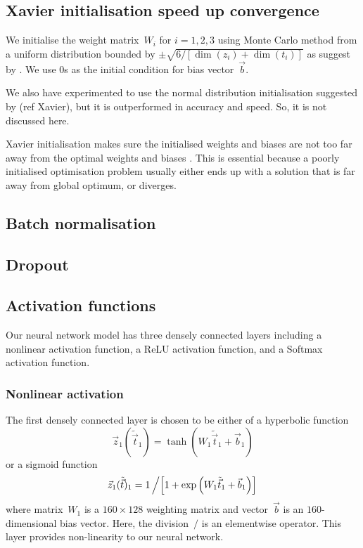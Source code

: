 \subsection{Xavier initialisation speed up convergence}
We initialise the weight matrix~$W_i$ for $i=1,2,3$ using Monte Carlo method from a uniform distribution bounded by $\pm \sqrt{6/\left[\dim(z_i)+\dim(t_i)\right]}$ as suggest by \citet{pmlr-v9-glorot10a}. We use $0$s as the initial condition for bias vector~$\vec b$.

We also have experimented to use the normal distribution initialisation suggested by (ref Xavier), but it is outperformed in accuracy and speed. So, it is not discussed here.

Xavier initialisation makes sure the initialised weights and biases are not too far away from the optimal weights and biases \citep{pmlr-v9-glorot10a}. This is essential because a poorly initialised optimisation problem usually either ends up with a solution that is far away from global optimum, or diverges.

\subsection{Batch normalisation}

\subsection{Dropout}

\subsection{Activation functions}
Our neural network model has three densely connected layers including a nonlinear activation function, a ReLU activation function, and a Softmax activation function.
\subsubsection{Nonlinear activation\label{sec:nonl}}
The first densely connected layer is chosen to be either of a hyperbolic function 
\begin{equation}
 \vec z_1(\tilde{\vec  t}_1)=\tanh(W_1\tilde{\vec  t}_1+\vec b_1) \label{eq:tanh}
\end{equation}
or a sigmoid function 
\begin{equation}
  \vec z_1 (\tilde{\vec  t})_1 =  {1}\left/\left[1 + \exp\left(W_1\tilde{\vec  t}_1+\vec b_1 \right)\right]\right.  \label{eq:sig}
\end{equation}
where matrix~$W_1$ is a $160\times128$ weighting matrix and vector~$\vec b$ is an $160$-dimensional bias vector. 
Here, the division~$/$ is an elementwise operator.
This layer provides non-linearity to our neural network.
